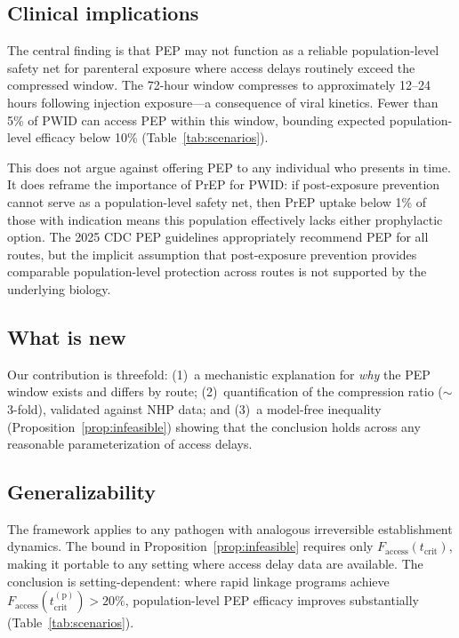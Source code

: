 \documentclass[12pt,a4paper]{article}
\theoremstyle{plain}
\theoremstyle{definition}
\theoremstyle{remark}
\newcommand{\tcrit}{t_{\mathrm{crit}}}
\begin{document}
\subsection{Clinical implications}

The central finding is that PEP may not function as a reliable population-level safety net for parenteral exposure where access delays routinely exceed the compressed window. The 72-hour window compresses to approximately 12--24 hours following injection exposure---a consequence of viral kinetics. Fewer than 5\% of PWID can access PEP within this window, bounding expected population-level efficacy below 10\% (Table~\ref{tab:scenarios}).

This does not argue against offering PEP to any individual who presents in time. It does reframe the importance of PrEP for PWID: if post-exposure prevention cannot serve as a population-level safety net, then PrEP uptake below 1\% of those with indication \citep{ref:Baugher2025} means this population effectively lacks either prophylactic option. The 2025 CDC PEP guidelines \citep{ref:Tanner2025} appropriately recommend PEP for all routes, but the implicit assumption that post-exposure prevention provides comparable population-level protection across routes is not supported by the underlying biology.

\subsection{What is new}

Our contribution is threefold: (1)~a mechanistic explanation for \emph{why} the PEP window exists and differs by route; (2)~quantification of the compression ratio ($\sim$3-fold), validated against NHP data; and (3)~a model-free inequality (Proposition~\ref{prop:infeasible}) showing that the conclusion holds across any reasonable parameterization of access delays.

\subsection{Generalizability}

The framework applies to any pathogen with analogous irreversible establishment dynamics. The bound in Proposition~\ref{prop:infeasible} requires only $F_{\mathrm{access}}(\tcrit)$, making it portable to any setting where access delay data are available. The conclusion is setting-dependent: where rapid linkage programs achieve $F_{\mathrm{access}}(\tcrit^{(\mathrm{p})}) > 20\%$, population-level PEP efficacy improves substantially (Table~\ref{tab:scenarios}).
\end{document}
